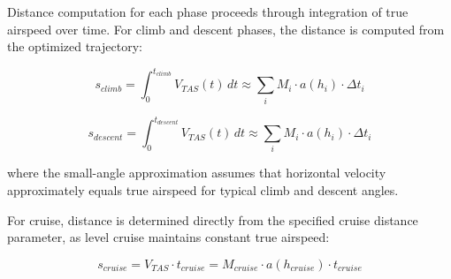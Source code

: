 Distance computation for each phase proceeds through integration of true airspeed over time. For climb and descent phases, the distance is computed from the optimized trajectory:

\begin{equation}
s_{climb} = \int_{0}^{t_{climb}} V_{TAS}(t) \, dt \approx \sum_{i} M_i \cdot a(h_i) \cdot \Delta t_i
\end{equation}

\begin{equation}
s_{descent} = \int_{0}^{t_{descent}} V_{TAS}(t) \, dt \approx \sum_{i} M_i \cdot a(h_i) \cdot \Delta t_i
\end{equation}

where the small-angle approximation assumes that horizontal velocity approximately equals true airspeed for typical climb and descent angles.

For cruise, distance is determined directly from the specified cruise distance parameter, as level cruise maintains constant true airspeed:

\begin{equation}
s_{cruise} = V_{TAS} \cdot t_{cruise} = M_{cruise} \cdot a(h_{cruise}) \cdot t_{cruise}
\end{equation}


